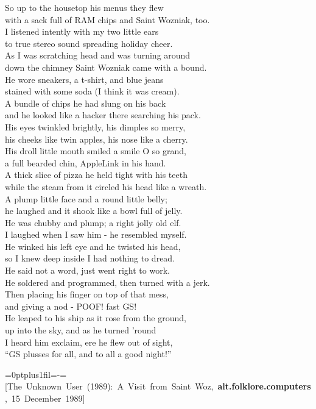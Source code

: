 \documentclass{report}
\newcommand\Right[1]{{%
  \leftskip=0ptplus1fil\rightskip=-\leftskip\parfillskip=\leftskip
  \hfill \phantom{ } \mbox{#1}\par}}
\newcommand{\citeusenet}[7]
{\Right{\rmfamily\footnotesize[\mbox{#1} (#3): #4, {\bfseries#5}, \mbox{#7 #3}]}}
\newenvironment{usenet}{\raggedright\small\ttfamily}{\rmfamily}
\begin{document}
\begin{usenet}
		So up to the housetop his menus they flew\\
		with a sack full of RAM chips and Saint Wozniak, too.\\
		I listened intently with my two little ears\\
		to true stereo sound spreading holiday cheer.\\
		As I was scratching head and was turning around\\
		down the chimney Saint Wozniak came with a bound.\\
		He wore sneakers, a t-shirt, and blue jeans\\
		stained with some soda (I think it was cream).\\
		A bundle of chips he had slung on his back\\
		and he looked like a hacker there searching his pack.\\
		His eyes twinkled brightly, his dimples so merry,\\
		his cheeks like twin apples, his nose like a cherry.\\
		His droll little mouth smiled a smile O so grand,\\
		a full bearded chin, AppleLink in his hand.\\
		A thick slice of pizza he held tight with his teeth\\
		while the steam from it circled his head like a wreath.\\
		A plump little face and a round little belly;\\
		he laughed and it shook like a bowl full of jelly.\\
		He was chubby and plump; a right jolly old elf.\\
		I laughed when I saw him - he resembled myself.\\
		He winked his left eye and he twisted his head,\\
		so I knew deep inside I had nothing to dread.\\
		He said not a word, just went right to work.\\
		He soldered and programmed, then turned with a jerk.\\
		Then placing his finger on top of that mess,\\
		and giving a nod - POOF! fast GS!\\
		He leaped to his ship as it rose from the ground,\\
		up into the sky, and as he turned 'round\\
		I heard him exclaim, ere he flew out of sight,\\
		``GS plusses for all, and to all a good night!''

		\citeusenet{The Unknown User}{unknown@ucscb.ucsc.edu}{1989}{A Visit from Saint Woz}{alt.folklore.computers}{\_mXEGBQNF\_A}
			{15 December}
	\end{usenet}
\end{document}
